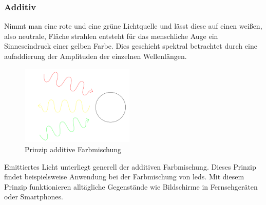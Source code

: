 \documentclass[11pt]{scrartcl}
\begin{document}
\subsubsection{Additiv}
Nimmt man eine rote und eine grüne Lichtquelle und lässt diese auf einen weißen, also neutrale, Fläche strahlen entsteht für das menschliche Auge
ein Sinneseindruck einer gelben Farbe. Dies geschieht spektral betrachtet durch eine aufaddierung der Amplituden der einzelnen Wellenlängen.
\cite[62]{lichtquellen}\\
\begin{figure}
    \vspace{-25pt}
    \begin{center}
        \includegraphics[width=0.48\textwidth]{images/additive_color_mixing.png}
    \end{center}
    \vspace{-20pt}
    \caption{Prinzip additive Farbmischung}
    \vspace{-15pt}
\end{figure}
Emittiertes Licht unterliegt generell der additiven Farbmischung. Dieses Prinzip findet beispielsweise Anwendung bei der Farbmischung von \ac{led}s.
Mit diesem Prinzip funktionieren alltägliche Gegenstände wie Bildschirme in Fernsehgeräten oder Smartphones.
\end{document}

